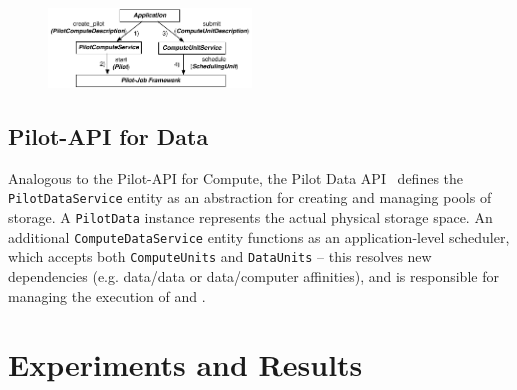 \documentclass[conference]{IEEEtran}
\begin{document}
\begin{figure}[t]
	\centering
  \upp\up
		\includegraphics[width=0.48\textwidth]{../figures/pilot-api-flow.pdf}
	\caption{}
	\label{fig:figures_pilot_api_flow}
\end{figure}



\subsection{Pilot-API for Data}

Analogous to the Pilot-API for Compute, the Pilot Data
API~\cite{pilot_api} defines the \texttt{PilotDataService} entity as
an abstraction for creating and managing pools of storage. A
\texttt{PilotData} instance represents the actual physical storage
space. An additional \texttt{ComputeDataService} entity functions as an
application-level scheduler, which accepts both
\texttt{Compute\-Units} and \texttt{DataUnits} -- this resolves new
dependencies (e.g. data/data or data/computer affinities), and is
responsible for managing the execution of \dus and \cus.

\section{Experiments and Results}\label{sec:exp_res}
\end{document}
